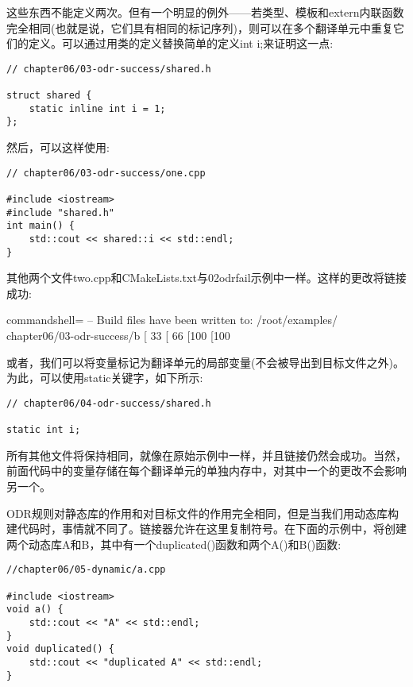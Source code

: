 这些东西不能定义两次。但有一个明显的例外——若类型、模板和extern内联函数完全相同(也就是说，它们具有相同的标记序列)，则可以在多个翻译单元中重复它们的定义。可以通过用类的定义替换简单的定义int i;来证明这一点:

\begin{lstlisting}[style=styleCXX]
// chapter06/03-odr-success/shared.h

struct shared {
	static inline int i = 1;
};
\end{lstlisting}

然后，可以这样使用:

\begin{lstlisting}[style=styleCXX]
// chapter06/03-odr-success/one.cpp

#include <iostream>
#include "shared.h"
int main() {
	std::cout << shared::i << std::endl;
}
\end{lstlisting}

其他两个文件two.cpp和CMakeLists.txt与02odrfail示例中一样。这样的更改将链接成功:

\begin{tcblisting}{commandshell={}}
-- Build files have been written to: /root/examples/
chapter06/03-odr-success/b
[ 33%
[ 66%
[100%
[100%
\end{tcblisting}

或者，我们可以将变量标记为翻译单元的局部变量(不会被导出到目标文件之外)。为此，可以使用static关键字，如下所示:

\begin{lstlisting}[style=styleCXX]
// chapter06/04-odr-success/shared.h

static int i;
\end{lstlisting}

所有其他文件将保持相同，就像在原始示例中一样，并且链接仍然会成功。当然，前面代码中的变量存储在每个翻译单元的单独内存中，对其中一个的更改不会影响另一个。


ODR规则对静态库的作用和对目标文件的作用完全相同，但是当我们用动态库构建代码时，事情就不同了。链接器允许在这里复制符号。在下面的示例中，将创建两个动态库A和B，其中有一个duplicated()函数和两个A()和B()函数:

\begin{lstlisting}[style=styleCXX]
//chapter06/05-dynamic/a.cpp

#include <iostream>
void a() {
	std::cout << "A" << std::endl;
}
void duplicated() {
	std::cout << "duplicated A" << std::endl;
}
\end{lstlisting}

